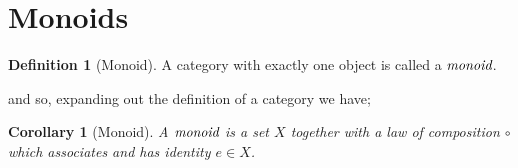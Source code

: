 \documentclass[10pt, oneside, reqno]{amsart}
\theoremstyle{plain}%
\newtheorem*{cor}{Corollary}
\theoremstyle{definition}
\newtheorem{defn}[thm]{Definition}
\theoremstyle{remark}
\begin{document}
\section{Monoids} %
\label{sec:monoids}

\begin{defn}[Monoid]
 A category with exactly one object is called a $\emph{monoid}$.
\end{defn}

and so, expanding out the definition of a category we have;
\begin{cor}[Monoid]
 A $\emph{monoid}$ is a set $X$ together with a law of composition $\circ$
 which associates and has identity $e \in X$.
\end{cor}
\end{document}

